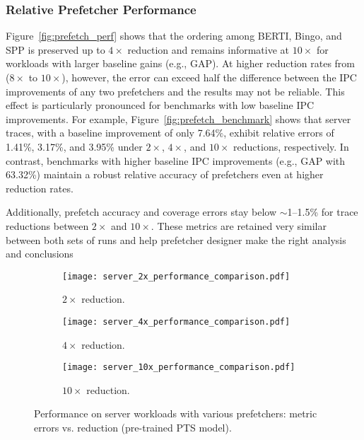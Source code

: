 \subsubsection*{Relative Prefetcher Performance}
Figure~\ref{fig:prefetch_perf} shows that the ordering among BERTI, Bingo, and SPP is preserved up to $4\times$ reduction and remains informative at $10\times$ for workloads with larger baseline gains (e.g., GAP). 
 At higher reduction rates from (\(8\times\) to \(10\times\)), however, the error can exceed half the difference between the IPC improvements of any two prefetchers and the results may not be reliable. This effect is particularly pronounced for benchmarks with low baseline IPC improvements. For example, Figure~\ref{fig:prefetch_benchmark} shows that server traces, with a baseline improvement of only 7.64$\%$, exhibit relative errors of 1.41\%, 3.17\%, and 3.95\% under \(2\times\), \(4\times\), and \(10\times\) reductions, respectively. In contrast, benchmarks with higher baseline IPC improvements (e.g., GAP with 63.32\%) maintain a robust relative accuracy of prefetchers even at higher reduction rates.
 
Additionally, prefetch accuracy and coverage errors stay below $\sim$1–1.5\% for trace reductions between \(2\times\) and \(10\times\). These metrics are retained very similar   between both sets of runs and help prefetcher designer make the right analysis and conclusions
\begin{figure*}[!htbp]
    \centering
    \captionsetup{skip=3pt}
    \captionsetup[subfigure]{font=footnotesize, skip=1pt}
    \begin{subfigure}[b]{0.33\textwidth}
        \centering
        \texttt{[image: server\_2x\_performance\_comparison.pdf]}
        \caption{$2\times$ reduction.}
    \end{subfigure}
    \hfill
    \begin{subfigure}[b]{0.33\textwidth}
        \centering
        \texttt{[image: server\_4x\_performance\_comparison.pdf]}
        \caption{$4\times$ reduction.}
    \end{subfigure}
    \hfill
    \begin{subfigure}[b]{0.33\textwidth}
        \centering
        \texttt{[image: server\_10x\_performance\_comparison.pdf]}
        \caption{$10\times$ reduction.}
    \end{subfigure}
 \caption{Performance on server workloads with various prefetchers: metric errors vs. reduction (pre-trained PTS model).}
    \label{fig:abs_prefetch_perf}
\end{figure*}
